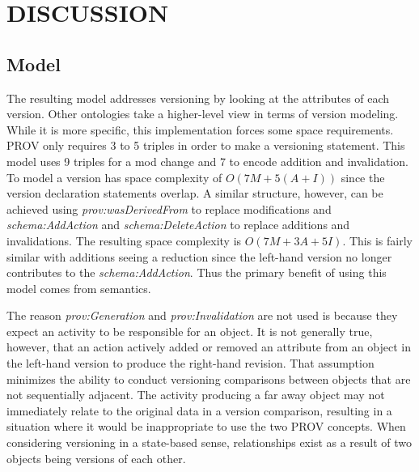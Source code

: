 
\chapter{DISCUSSION}

\section{Model}

The resulting model addresses versioning by looking at the attributes of each version.
Other ontologies take a higher-level view in terms of version modeling.
While it is more specific, this implementation forces some space requirements.
PROV only requires 3 to 5 triples in order to make a versioning statement.
This model uses 9 triples for a mod change and 7 to encode addition and invalidation.
To model a version has space complexity of \(O(7M+5(A+I))\) since the version declaration statements overlap.
A similar structure, however, can be achieved using \textit{prov:wasDerivedFrom} to replace modifications and \textit{schema:AddAction} and \textit{schema:DeleteAction} to replace additions and invalidations.
The resulting space complexity is \(O(7M+3A+5I)\).
This is fairly similar with additions seeing a reduction since the left-hand version no longer contributes to the \textit{schema:AddAction}.
Thus the primary benefit of using this model comes from semantics.

The reason \textit{prov:Generation} and \textit{prov:Invalidation} are not used is because they expect an activity to be responsible for an object.
It is not generally true, however, that an action actively added or removed an attribute from an object in the left-hand version to produce the right-hand revision.
That assumption minimizes the ability to conduct versioning comparisons between objects that are not sequentially adjacent.
The activity producing a far away object may not immediately relate to the original data in a version comparison, resulting in a situation where it would be inappropriate to use the two PROV concepts.
When considering versioning in a state-based sense, relationships exist as a result of two objects being versions of each other.

